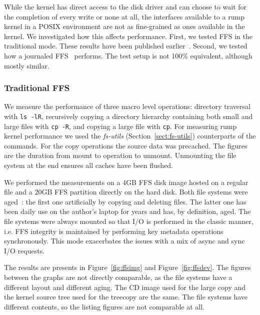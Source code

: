 While the kernel has direct access to the disk driver and can
choose to wait for the completion of every write or none at all, the
interfaces available to a rump kernel in a POSIX environment are not as
fine-grained as ones available in the kernel.  We investigated how this
affects performance.  First, we tested FFS in the traditional mode.
These results have been published earlier~\cite{kantee:rumpfs}.
Second, we tested how a journaled FFS~\cite{man4:wapbl} performs.
The test setup is not 100\% equivalent, although mostly similar.

\subsubsection*{Traditional FFS}

We measure the performance of three macro level operations: directory
traversal with \texttt{ls -lR}, recursively copying a directory
hierarchy containing both small and large files with \texttt{cp -R},
and copying a large file with \texttt{cp}.  For measuring rump kernel
performance we used the \textit{fs-utils} (Section~\ref{sect:fs-utils})
counterparts of the commands.  For the copy operations the source data
was precached.  The figures are the duration from mount to operation
to unmount.  Unmounting the file system at the end ensures all caches
have been flushed.

We performed the measurements on a 4GB FFS disk image hosted on a
regular file and a 20GB FFS partition directly on the hard disk.
Both file systems were aged~\cite{smith:aging}: the first one
artificially by copying and deleting files.  The latter one has
been daily use on the author's laptop for years and has, by
definition, aged.  The file systems were always mounted so that
I/O is performed in the classic manner, i.e. FFS integrity is
maintained by performing key metadata operations synchronously.
This mode exacerbates the issues with a mix of async and sync I/O
requests.

The results are presents in Figure~\ref{fig:ffsimg} and
Figure~\ref{fig:ffsdev}.  The figures between the graphs are not
directly comparable, as the file systems have a different layout
and different aging.  The CD image used for the large copy and the
kernel source tree used for the treecopy are the same.  The file
systems have different contents, so the listing figures are not
comparable at all.

